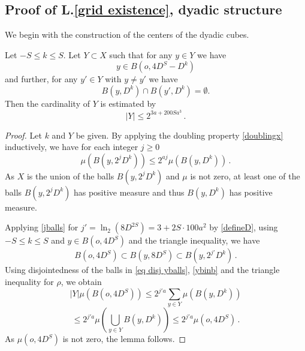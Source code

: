 \subsection{Proof of L.\ref{grid existence}, dyadic structure}
\label{subsecdyadic}

We begin with the construction of the centers of the dyadic cubes.
\begin{lemma}\label{counting balls}
Let $-S\le k\le S$. Let $Y\subset X$ such that for any $y\in Y$
we have
\begin{equation}\label{ybinb}
  y\in B(o,4D^S-D^k)
\end{equation}
and further, for any $y'\in Y$ with $y\neq y'$ we have
\begin{equation} \label{eq disj yballs}
    B(y,D^k)\cap B(y',D^k)=\emptyset.
\end{equation}
Then  the cardinality of $Y$ is estimated by
\begin{equation}\label{boundY}
    |Y|\le 2^{3a + 200Sa^3}\, .
\end{equation}
\end{lemma}


\begin{proof}
   Let $k$ and $Y$ be given.
  By applying the doubling property \eqref{doublingx} inductively, we have for each integer $j\ge 0$
  \begin{equation}\label{jballs}
      \mu(B(y,2^{j}D^k))\le 2^{aj} \mu(B(y,D^k))\, .
  \end{equation}
 As $X$ is the union of the balls $B(y,2^{j}D^k)$ and $\mu$ is not zero, at least one of
 the balls $B(y,2^{j}D^k)$ has positive measure and thus $B(y,D^k)$ has positive measure.

 Applying \eqref{jballs} for $j' = \ln_2(8D^{2S}) = 3 + 2S \cdot 100a^2$ by \eqref{defineD}, using $-S\le k\le S$
 and $y\in B(o,4D^S)$ and the triangle inequality, we have
   \begin{equation}
     B(o, 4D^S) \subset B(y, 8D^S) \subset B(y,2^{j'}D^k) \, .
  \end{equation}
Using disjointedness of the balls in \eqref{eq disj yballs}, \eqref{ybinb} and the triangle inequality for $\rho$, we obtain
\begin{equation}
|Y|\mu(B(o,4D^S))\le 2^{j'a}\sum_{y\in Y}\mu(B(y,D^k))
\end{equation}
\begin{equation}
\le
2^{j'a}\mu(\bigcup_{y\in Y}B(y,D^k))
\le 2^{j'a}\mu(o,4D^S)\, .
\end{equation}
As $\mu(o,4D^S)$ is not zero, the lemma follows.
\end{proof}

